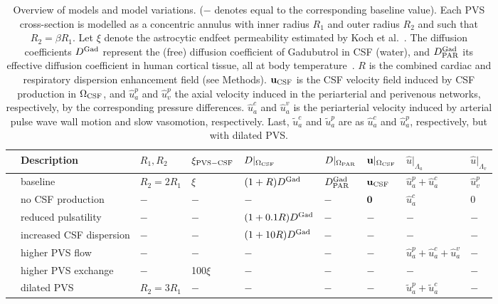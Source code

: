 \documentclass[fleqn,10pt]{wlscirep}
\begin{document}
\begin{table}
  \begin{center}
  \begin{tabular}{ll|llll|lll}
    \toprule
    & Description & $R_1, R_2$ & $\xi_{\rm PVS-CSF}$ & $D|_{\Omega_{\rm CSF}}$ & $D|_{\Omega_{\rm PAR}}$ & $\mathbf{u}|_{\Omega_{\rm CSF}}$ & $\hat{u}|_{\Lambda_a}$ & $\hat{u}|_{\Lambda_v}$  \\
    \midrule
     & baseline & $R_2 = 2 R_1$ & $\xi$ & $(1 + R) D^{\rm Gad}$ & $D^{\rm Gad}_{\rm PAR}$ & $\mathbf{u}_{\rm CSF}$ & $\hat{u}_a^p + \hat{u}_a^c$  & $\hat{u}_v^p$ \\ 
    & no CSF production & $-$ & $-$ & $-$ & $-$ & $\mathbf{0}$ & $\hat{u}_a^c$ & $0$ \\ 
    & reduced pulsatility & $-$ & $-$ & $ (1 + 0.1 R) D^{\rm Gad}$ & $-$ & $-$ & $-$  & $-$ \\ 
    & increased CSF dispersion & $-$ & $-$ & $ (1 + 10 R) D^{\rm Gad}$ & $-$ & $-$ & $-$  & $-$ \\ 
    & higher PVS flow & $-$ & $-$ & $-$ & $-$ & $-$ & $\hat{u}_a^p + \hat{u}_a^c + \hat{u}_a^v$  & $-$ \\ 
    & higher PVS exchange & $-$ & 100$\xi$  &  $-$ & $-$ & $-$ & $-$  & $-$ \\ 
    & dilated PVS & $R_2 = 3 R_1$ & $-$ & $-$ & $-$ & $-$ & $\tilde{u}_a^p + \tilde{u}_a^c$  & $-$ \\ 
    \bottomrule
    \end{tabular}
    \end{center}
  \caption{Overview of models and model variations. ($-$ denotes equal
    to the corresponding baseline value). Each PVS cross-section is
    modelled as a concentric annulus with inner radius $R_1$ and outer
    radius $R_2$ and such that $R_2 = \beta R_1$. Let $\xi$ denote the
    astrocytic endfeet permeability estimated by Koch et
    al.~\cite{koch2023estimates}. The diffusion coefficients $D^{\rm
      Gad}$ represent the (free) diffusion coefficient of Gadubutrol
    in CSF (water), and $D^{\rm Gad}_{\rm PAR}$ its effective
    diffusion coefficient in human cortical tissue, all at body
    temperature~\cite{sykova2008diffusion, valnes2020apparent}. $R$ is
    the combined cardiac and respiratory dispersion enhancement field
    (see Methods). $\mathbf{u}_{\rm CSF}$ is the CSF velocity field
    induced by CSF production in $\Omega_{\rm CSF}$, and $\hat{u}_a^p$
    and $\hat{u}_v^p$ the axial velocity induced in the periarterial
    and perivenous networks, respectively, by the corresponding
    pressure differences. $\hat{u}_a^c$ and $\hat{u}_a^v$ is the
    periarterial velocity induced by arterial pulse wave wall motion
    and slow vasomotion, respectively. Last, $\tilde{u}_a^c$ and
    $\tilde{u}_a^p$ are as $\hat{u}_a^c$ and $\hat{u}_a^p$,
    respectively, but with dilated PVS.}
\label{tab:scenarios}
\end{table}
\end{document}
